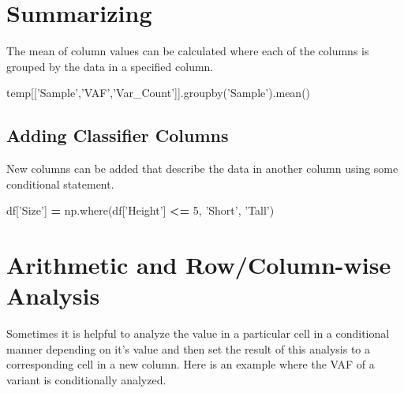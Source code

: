 \documentclass[]{book}
\newenvironment{Shaded}{\begin{snugshade}}{\end{snugshade}}
\newcommand{\DecValTok}[1]{\textcolor[rgb]{0.00,0.00,0.81}{#1}}
\newcommand{\NormalTok}[1]{#1}
\newcommand{\OperatorTok}[1]{\textcolor[rgb]{0.81,0.36,0.00}{\textbf{#1}}}
\newcommand{\StringTok}[1]{\textcolor[rgb]{0.31,0.60,0.02}{#1}}
\begin{document}
\hypertarget{summarizing}{%
\section{Summarizing}\label{summarizing}}

The mean of column values can be calculated where each of the columns is grouped by the data in a specified column.

\begin{Shaded}
\begin{Highlighting}[]
\NormalTok{temp[[}\StringTok{'Sample'}\NormalTok{,}\StringTok{'VAF'}\NormalTok{,}\StringTok{'Var_Count'}\NormalTok{]].groupby(}\StringTok{'Sample'}\NormalTok{).mean()}
\end{Highlighting}
\end{Shaded}

\hypertarget{adding-classifier-columns}{%
\subsection{Adding Classifier Columns}\label{adding-classifier-columns}}

New columns can be added that describe the data in another column using some conditional statement.

\begin{Shaded}
\begin{Highlighting}[]
\NormalTok{df[}\StringTok{'Size'}\NormalTok{] }\OperatorTok{=}\NormalTok{ np.where(df[}\StringTok{'Height'}\NormalTok{] }\OperatorTok{<=} \DecValTok{5}\NormalTok{, }\StringTok{'Short'}\NormalTok{, }\StringTok{'Tall'}\NormalTok{)}
\end{Highlighting}
\end{Shaded}

\hypertarget{arithmetic-and-rowcolumn-wise-analysis}{%
\section{Arithmetic and Row/Column-wise Analysis}\label{arithmetic-and-rowcolumn-wise-analysis}}

Sometimes it is helpful to analyze the value in a particular cell in a conditional manner depending on it's value and then set the result of this analysis to a corresponding cell in a new column. Here is an example where the VAF of a variant is conditionally analyzed.
\end{document}
